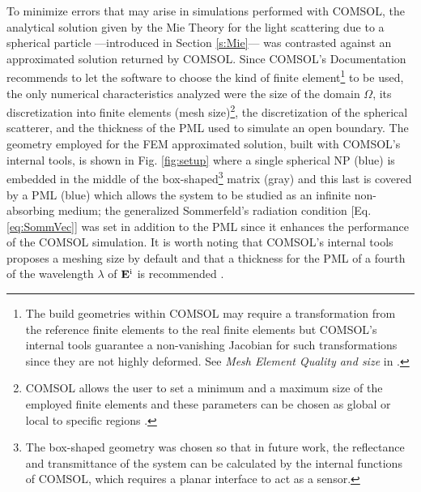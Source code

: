 To minimize errors that may arise in simulations performed with COMSOL, the analytical solution given by the Mie Theory for the light scattering due to a spherical particle ---introduced in Section \ref{s:Mie}--- was contrasted against an approximated solution returned by COMSOL. Since COMSOL's Documentation \cite{comsol_doc} recommends to let the software to choose the kind of finite element\footnote{The build geometries within COMSOL may require a transformation from the reference finite elements to the real finite elements but COMSOL's internal tools guarantee a non-vanishing Jacobian for such transformations since they are not highly deformed. See \textit{Mesh Element Quality and size} in \cite{comsol_doc}.} to be used, the only numerical characteristics analyzed were the size of the domain $\Omega$, its discretization into finite elements (mesh size)\footnote{COMSOL allows the user to set a minimum and a maximum size of the employed finite elements and these parameters can be chosen as global or local to specific regions \cite{comsol_doc}.}, the discretization of the spherical scatterer, and the thickness of the PML used to simulate an open boundary. The geometry employed for the FEM approximated solution, built with COMSOL's internal tools, is shown in Fig. \ref{fig:setup} where a single spherical NP (blue) is embedded in  the middle of the box-shaped\footnote{The box-shaped geometry was chosen so that in future work, the reflectance and transmittance of the system can be calculated by the internal functions of COMSOL, which requires a planar interface to act as a sensor.} matrix (gray) and this last is covered by a PML (blue) which allows the system to be studied as an infinite non-absorbing medium; the generalized Sommerfeld's radiation condition [Eq. \eqref{eq:SommVec}] was set in addition to the PML since it enhances the performance of the COMSOL simulation. It is worth noting that COMSOL's internal tools proposes a meshing size by default \cite{comsol_doc} and that a thickness for the PML of a fourth of the wavelength $\lambda$ of $\vb{E}^\text{i}$ is recommended \cite{comsol_wave}.

